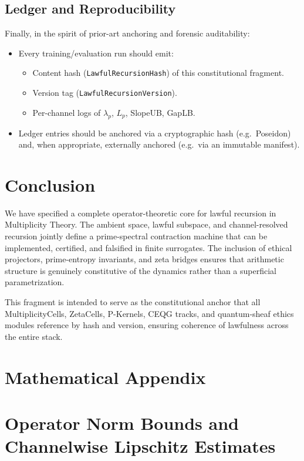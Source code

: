 \documentclass[11pt]{article}
\begin{document}
\subsection{Ledger and Reproducibility}

Finally, in the spirit of prior-art anchoring and forensic auditability:
\begin{itemize}[leftmargin=1.5em]
  \item Every training/evaluation run should emit:
    \begin{itemize}
      \item Content hash (\texttt{LawfulRecursionHash}) of this constitutional fragment.
      \item Version tag (\texttt{LawfulRecursionVersion}).
      \item Per-channel logs of $\lambda_p$, $L_p$, SlopeUB, GapLB.
    \end{itemize}
  \item Ledger entries should be anchored via a cryptographic hash (e.g.\ Poseidon) and, when appropriate, externally anchored (e.g.\ via an immutable manifest).
\end{itemize}

\section{Conclusion}

We have specified a complete operator-theoretic core for lawful recursion in Multiplicity Theory.
The ambient space, lawful subspace, and channel-resolved recursion jointly define a prime-spectral contraction machine that can be implemented, certified, and falsified in finite surrogates.
The inclusion of ethical projectors, prime-entropy invariants, and zeta bridges ensures that arithmetic structure is genuinely constitutive of the dynamics rather than a superficial parametrization.

This fragment is intended to serve as the constitutional anchor that all MultiplicityCells, ZetaCells, P-Kernels, CEQG tracks, and quantum-sheaf ethics modules reference by hash and version, ensuring coherence of lawfulness across the entire stack.

\appendix
\section*{Mathematical Appendix}

\section{Operator Norm Bounds and Channelwise Lipschitz Estimates}
\end{document}
